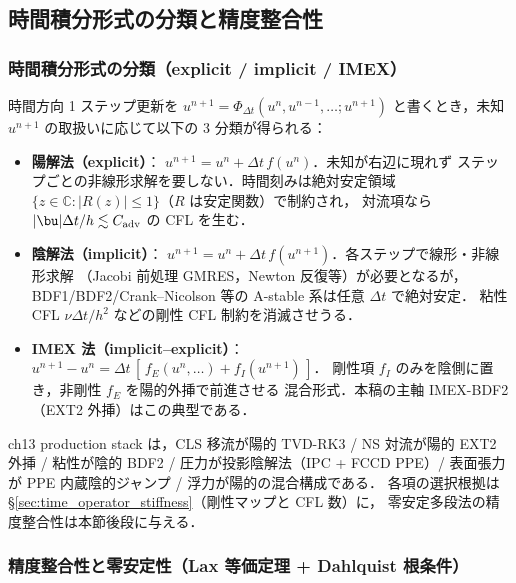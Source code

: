 \subsection{時間積分形式の分類と精度整合性}
\label{sec:time_accuracy_principle}

\subsubsection*{時間積分形式の分類（explicit / implicit / IMEX）}
\label{sec:scheme_classification}

時間方向 1 ステップ更新を $u^{n+1} = \Phi_{\Delta t}(u^n, u^{n-1}, \ldots; u^{n+1})$
と書くとき，未知 $u^{n+1}$ の取扱いに応じて以下の 3 分類が得られる：
\begin{itemize}[leftmargin=2em]
  \item \textbf{陽解法（explicit）}：
        $u^{n+1} = u^n + \Delta t\,f(u^n)$．未知が右辺に現れず
        ステップごとの非線形求解を要しない．時間刻みは絶対安定領域
        $\{z\in\mathbb{C} : |R(z)|\le 1\}$（$R$ は安定関数）で制約され，
        対流項なら $|\bu|\Delta t/h\lesssim C_{\mathrm{adv}}$ の CFL を生む．
  \item \textbf{陰解法（implicit）}：
        $u^{n+1} = u^n + \Delta t\,f(u^{n+1})$．各ステップで線形・非線形求解
        （Jacobi 前処理 GMRES，Newton 反復等）が必要となるが，
        BDF1/BDF2/Crank--Nicolson 等の A-stable 系は任意 $\Delta t$ で絶対安定．
        粘性 CFL $\nu\Delta t/h^2$ などの剛性 CFL 制約を消滅させうる．
  \item \textbf{IMEX 法（implicit--explicit）}：
        $u^{n+1} - u^n = \Delta t\,[\,f_E(u^n,\ldots) + f_I(u^{n+1})\,]$．
        剛性項 $f_I$ のみを陰側に置き，非剛性 $f_E$ を陽的外挿で前進させる
        混合形式．本稿の主軸 IMEX-BDF2（EXT2 外挿）はこの典型である．
\end{itemize}
ch13 production stack は，CLS 移流が陽的 TVD-RK3 / NS 対流が陽的 EXT2 外挿 /
粘性が陰的 BDF2 / 圧力が投影陰解法（IPC + FCCD PPE）/ 表面張力が
PPE 内蔵陰的ジャンプ / 浮力が陽的の混合構成である．
各項の選択根拠は §\ref{sec:time_operator_stiffness}（剛性マップと CFL 数）に，
零安定多段法の精度整合性は本節後段に与える．

\subsubsection*{精度整合性と零安定性（Lax 等価定理 + Dahlquist 根条件）}
\label{sec:time_accuracy_lax}

